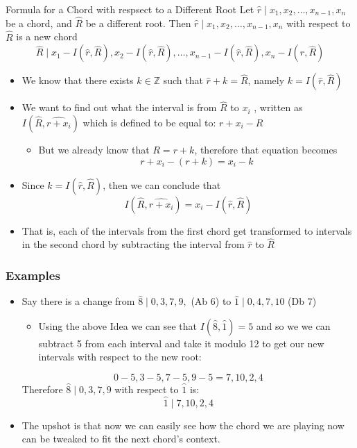 \documentclass{standalone}
\begin{document}
\begin{theo*}{Formula for a Chord with respsect to a Different Root}
  Let $ \widehat{r} \mid x_{1} , x_{2} , \dotsc  , x_{n - 1} , x_{n}$ be a chord, and $ \widehat{R}$ be a different root. Then $ \widehat{r} \mid x_{1} , x_{2} , \dotsc  , x_{n - 1} , x_    {n}$ with respect to $ \widehat{R}$ is a new chord
  \[
  \widehat{R} \mid x_{1}  -  I\left( \widehat{r}, \widehat{R}\right) , x_{2}-  I\left( \widehat{r}, \widehat{R}\right) , \dotsc  , x_{n - 1}-  I\left( \widehat{r}, \widehat{R}\right) , x_{n}-  I\left( \widehat{r}, \widehat{R}\right)
  \]
  \begin{pf}
    \begin{itemize}
      \item We know that there exists $k \in \mathbb{Z}$ such that $ \widehat{r}  +  k = \widehat{R}$, namely $k = I\left( \widehat{r}, \widehat{R}\right)$                               
      \item We want to find out what the interval is from $ \widehat{R}$ to  $x_{i}$ , written as $I\left( \widehat{R}, \widehat{r  +  x_{i}}\right)$ which is defined to be equal to: $ r  +  x_{i}  -  R$
        \begin{itemize}
          \item But we already know that $R = r  + k$, therefore that equation becomes
            \[
            r  +  x_{i}   -  \left( r  +  k \right) = x_{i}  -  k 
            \]
        \end{itemize}
      \item Since $k = I\left( \widehat{r}, \widehat{R}\right)$, then we can conclude that 
        \[
        I\left( \widehat{R}, \widehat{r  +  x_{i}}\right)= x_{i}  -  I\left( \widehat{r}, \widehat{R}\right)
        \]
      \item That is, each of the intervals from the first chord get transformed to intervals in the second chord by subtracting the interval from $ \widehat{r}$ to $ \widehat{R}$ 
    \end{itemize}
  \end{pf}
  \subsubsection*{Examples}
  \begin{itemize}
    \item Say there is a change from $ \widehat{8} \mid 0, 3, 7, 9,$ (Ab 6) to $ \widehat{1} \mid 0, 4, 7, 10$ (Db 7)
      \begin{itemize}
        \item Using the above Idea we can see that $I\left( \widehat{8}, \widehat{1}\right) = 5$ and so we we can subtract 5 from each interval and take it modulo 12 to get our new intervals with respect to the new root:
      \end{itemize}
      \[
      0  - 5, 3 -5, 7 -5, 9 -5  = 7, 10, 2, 4 
      \]
      Therefore $ \widehat{8} \mid 0, 3, 7, 9$ with respect to $ \widehat{1}$ is: 
      \[
      \widehat{1} \mid 7, 10, 2, 4 
      \]
    \item The upshot is that now we can easily see how the chord we are playing now can be tweaked to fit the next chord's context.
  \end{itemize}
\end{theo*}
\end{document}
